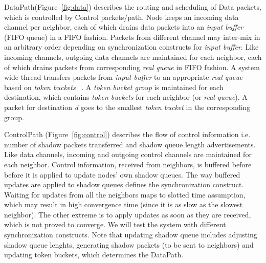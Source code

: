 DataPath(Figure~\ref{fig:data}) describes the routing and scheduling of Data packets, which is controlled by Control packets/path. Node keeps an incoming data channel per neighbor, each of which drains data packets into an \textit{input buffer} (FIFO queue) in a FIFO fashion. Packets from different channel may inter-mix in an arbitrary order depending on synchronization constructs for \textit{input buffer}. Like incoming channels, outgoing data channels are maintained for each neighbor, each of which drains packets from corresponding \textit{real queue} in FIFO fashion. A system wide thread transfers packets from \textit{input buffer} to an appropriate \textit{real queue} based on \textit{token buckets} ~\cite{Srikant3}. A \textit{token bucket group} is maintained for each destination, which contains \textit{token buckets} for each neighbor (or \textit{real queue}). A packet for destination \textit{d} goes to the smallest \textit{token bucket} in the corresponding group.

ControlPath (Figure~\ref{fig:control}) describes the flow of control information i.e. number of shadow packets transferred and shadow queue length advertisements. Like data channels, incoming and outgoing control channels are maintained for each neighbor. Control information, received from neighbors, is buffered before before it is applied to update nodes' own shadow queues. The way buffered updates are applied to shadow queues defines the synchronization construct. Waiting for updates from all the neighbors maps to slotted time assumption, which may result in high convergence time (since it is as slow as the slowest neighbor). The other extreme is to apply updates as soon as they are received, which is not proved to converge. We will test the system with different synchronization constructs. Note that updating shadow queue includes adjusting shadow queue lenghts, generating shadow packets (to be sent to neighbors) and updating token buckets, which determines the DataPath.
